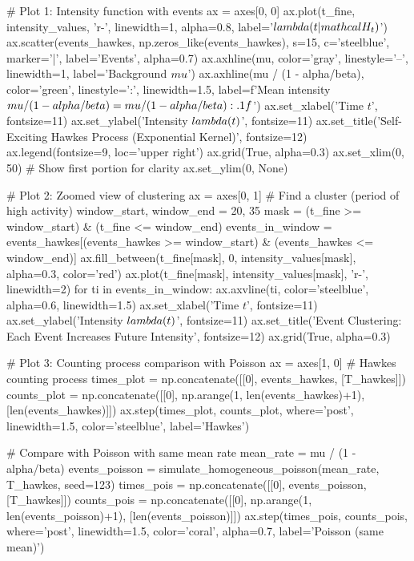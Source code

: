 \documentclass[a4paper, 11pt]{article}
\begin{document}
\begin{pycode}
# Plot 1: Intensity function with events
ax = axes[0, 0]
ax.plot(t_fine, intensity_values, 'r-', linewidth=1, alpha=0.8, label='$\\lambda(t|\\mathcal{H}_t)$')
ax.scatter(events_hawkes, np.zeros_like(events_hawkes), s=15, c='steelblue',
           marker='|', label='Events', alpha=0.7)
ax.axhline(mu, color='gray', linestyle='--', linewidth=1, label='Background $\\mu$')
ax.axhline(mu / (1 - alpha/beta), color='green', linestyle=':', linewidth=1.5,
           label=f'Mean intensity $\\mu/(1-\\alpha/\\beta) = {mu/(1-alpha/beta):.1f}$')
ax.set_xlabel('Time $t$', fontsize=11)
ax.set_ylabel('Intensity $\\lambda(t)$', fontsize=11)
ax.set_title('Self-Exciting Hawkes Process (Exponential Kernel)', fontsize=12)
ax.legend(fontsize=9, loc='upper right')
ax.grid(True, alpha=0.3)
ax.set_xlim(0, 50)  # Show first portion for clarity
ax.set_ylim(0, None)

# Plot 2: Zoomed view of clustering
ax = axes[0, 1]
# Find a cluster (period of high activity)
window_start, window_end = 20, 35
mask = (t_fine >= window_start) & (t_fine <= window_end)
events_in_window = events_hawkes[(events_hawkes >= window_start) & (events_hawkes <= window_end)]
ax.fill_between(t_fine[mask], 0, intensity_values[mask], alpha=0.3, color='red')
ax.plot(t_fine[mask], intensity_values[mask], 'r-', linewidth=2)
for ti in events_in_window:
    ax.axvline(ti, color='steelblue', alpha=0.6, linewidth=1.5)
ax.set_xlabel('Time $t$', fontsize=11)
ax.set_ylabel('Intensity $\\lambda(t)$', fontsize=11)
ax.set_title('Event Clustering: Each Event Increases Future Intensity', fontsize=12)
ax.grid(True, alpha=0.3)

# Plot 3: Counting process comparison with Poisson
ax = axes[1, 0]
# Hawkes counting process
times_plot = np.concatenate([[0], events_hawkes, [T_hawkes]])
counts_plot = np.concatenate([[0], np.arange(1, len(events_hawkes)+1), [len(events_hawkes)]])
ax.step(times_plot, counts_plot, where='post', linewidth=1.5, color='steelblue', label='Hawkes')

# Compare with Poisson with same mean rate
mean_rate = mu / (1 - alpha/beta)
events_poisson = simulate_homogeneous_poisson(mean_rate, T_hawkes, seed=123)
times_pois = np.concatenate([[0], events_poisson, [T_hawkes]])
counts_pois = np.concatenate([[0], np.arange(1, len(events_poisson)+1), [len(events_poisson)]])
ax.step(times_pois, counts_pois, where='post', linewidth=1.5, color='coral',
        alpha=0.7, label='Poisson (same mean)')


\end{pycode}
\end{document}
